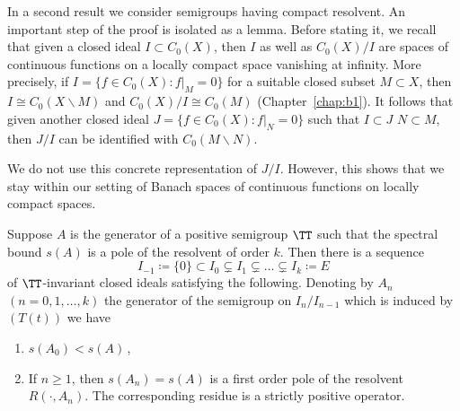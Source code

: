 In a second result we consider semigroups having compact resolvent.
An important step of the proof is isolated as a lemma.
Before stating it, we recall that given a closed ideal $I \subset C_{0}(X)$, then $I$ as well as $C_{0}(X)/I$ are spaces of continuous functions on a locally compact space vanishing at infinity.
More precisely, if\/ $I = \{f \in C_{0}(X) \colon f|_{M} = 0\}$ for a suitable closed subset $M \subset X$, then $I \cong C_{0}(X\backslash M)$ and $C_{0}(X)/I \cong C_{0}(M)$ (\cf Chapter~\ref{chap:b1}).
It follows that given another closed ideal $J = \{f \in C_{0}(X) \colon f|_{N} = 0\}$ such that $I \subset J$ \ie $N \subset M$, then $J/I$ can be identified with $C_{0}(M\backslash N)$.

We do not use this concrete representation of\/ $J/I$.
However, this shows that we stay within our setting of Banach spaces of continuous functions on locally compact spaces.
\begin{lemma}\label{lem:b3-2.8}
Suppose $A$ is the generator of a positive semigroup $\TT$ such that the spectral bound $s(A)$ is a pole of the resolvent%
of order $k$.
Then there is a sequence
\begin{equation}\label{eq:b3-2.16}
    I_{-1} \coloneqq \{0\} \subset I_{0} \subsetneq I_{1} \subsetneq \ldots \subsetneq I_{k} \coloneqq E
\end{equation}
of\/ $\TT$-invariant closed ideals satisfying the following. 
Denoting by $A_{n}$ $(n = 0,1,\ldots,k)$ the generator of the semigroup on $I_{n}/I_{n-1}$ which is induced by $(T(t))$ we have
\begin{enumerate}[\upshape (i)]
    \item 
    $s(A_{0}) < s(A)$\,,
    
    \item 
    If\/ $n \geq 1$, then $s(A_{n}) = s(A)$ is a first order pole of the resolvent $R(\cdot,A_{n})$. 
    The corresponding residue is a strictly positive operator.
\end{enumerate}
\end{lemma}
